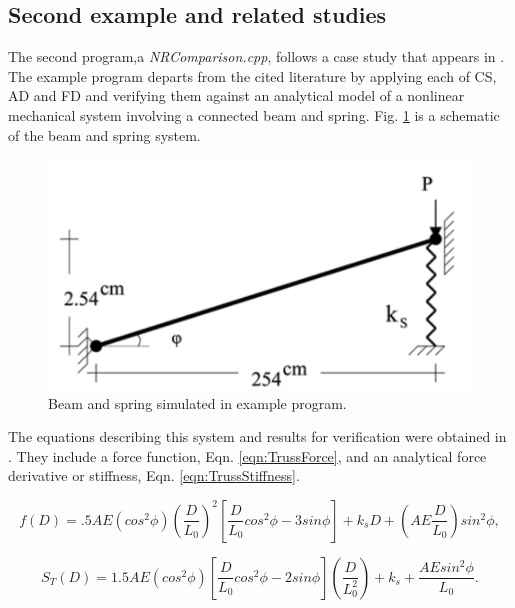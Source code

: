 \documentclass[preprint,12pt]{elsarticle}
\begin{document}
\subsection{Second example and related studies} 
\label{subsec:Validation}
The second program,a \emph{NRComparison.cpp}, follows a case study that appears in
\cite{rezaiee2010dynamic}. The example program departs from the cited
literature by applying each of CS, AD and FD and verifying them against an
analytical model of a nonlinear mechanical system involving a connected beam
and spring. Fig. \ref{fig:TrussSchematic} is a schematic of the beam and spring
system. 

\begin{figure}[tbp] \centering \includegraphics{./figs/truss.png}
\caption{Beam and spring simulated in example program.} \label{fig:TrussSchematic}
\end{figure}

The equations describing this system and results for verification were obtained
in \cite{rezaiee2010dynamic}. They include a force function, Eqn.
\ref{eqn:TrussForce}, and an analytical force derivative or stiffness, Eqn.
\ref{eqn:TrussStiffness}.

\begin{equation} 
    \label{eqn:TrussForce}
    f(D) = .5AE(cos^{2}\phi)(\frac{D}{L_{0}})^{2}[\frac{D}{L_{0}}cos^{2}\phi - 3sin\phi] + k_{s}D + (AE\frac{D}{L_{0}})sin^{2}\phi,
\end{equation} 

\begin{equation} 
    \label{eqn:TrussStiffness}
    S_{T}(D) = 1.5AE(cos^{2}\phi)[\frac{D}{L_{0}}cos^{2}\phi - 2sin\phi](\frac{D}{L_{0}^{2}}) + k_{s} + \frac{AEsin^{2}\phi}{L_{0}}.
\end{equation}
\end{document}
